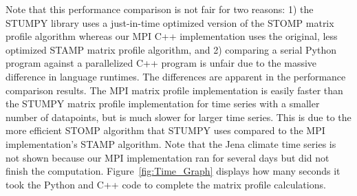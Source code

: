 \documentclass[conference]{IEEEtran}
\begin{document}
Note that this performance comparison is not fair for two reasons:  1) the STUMPY library uses a just-in-time optimized version of the STOMP matrix profile algorithm\cite{Stumpy} whereas our MPI C++ implementation uses the original, less optimized STAMP matrix profile algorithm\cite{MatrixProfile1}, and 2) comparing a serial Python program against a parallelized C++ program is unfair due to the massive difference in language runtimes.  The differences are apparent in the performance comparison results. 
The MPI matrix profile implementation is easily faster than the STUMPY matrix profile implementation for time series with a smaller number of datapoints, but is much slower for larger time series.  This is due to the more efficient STOMP algorithm that STUMPY uses compared to the MPI implementation's STAMP algorithm.  Note that the Jena climate time series is not shown because our MPI implementation ran for several days but did not finish the computation.  Figure~\ref{fig:Time_Graph} displays how many seconds it took the Python and C++ code to complete the matrix profile calculations.
\end{document}
